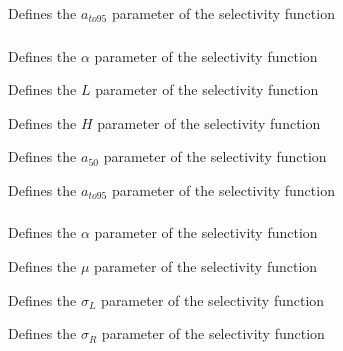  {Defines the $a_{to95}$ parameter of the selectivity function}

\subsubsection[Logistic producing]{}

 {Defines the $\alpha$ parameter of the selectivity function}

 {Defines the $L$ parameter of the selectivity function}

 {Defines the $H$ parameter of the selectivity function}

 {Defines the $a_{50}$ parameter of the selectivity function}

 {Defines the $a_{to95}$ parameter of the selectivity function}

\subsubsection[Double-normal]{}

 {Defines the $\alpha$ parameter of the selectivity function}

 {Defines the $\mu$ parameter of the selectivity function}

 {Defines the $\sigma_L$ parameter of the selectivity function}

 {Defines the $\sigma_R$ parameter of the selectivity function}

\subsubsection[Double-exponential]{}

